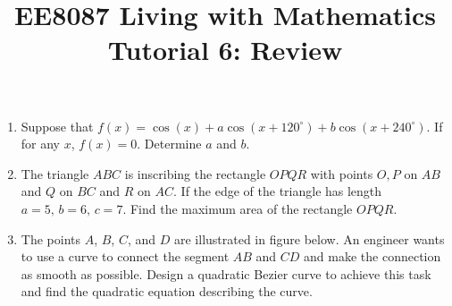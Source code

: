 \documentclass{article}
\title{EE8087 Living with Mathematics\\Tutorial 6: Review}
\date{}
\begin{document}
 \maketitle
\begin{enumerate}
\item Suppose that $f(x) = \cos(x)+a\cos(x+120^\circ)+b\cos(x+240^\circ)$. If for any $x$, $f(x) = 0$. Determine $a$ and $b$.
\item The triangle $ABC$ is inscribing the rectangle $OPQR$ with points $O,P$ on $AB$ and $Q$ on $BC$ and $R$ on $AC$. If the edge of the triangle has length $a = 5,\,b = 6,\, c = 7$. Find the maximum area of the rectangle $OPQR$.
  \begin{figure}[ht]
    \centering
  \end{figure}

\item The points $A$, $B$, $C$, and $D$ are illustrated in figure below. An engineer wants to use a curve to connect the segment $AB$ and $CD$ and make the connection as smooth as possible. Design a quadratic Bezier curve to achieve this task and find the quadratic equation describing the curve.

  \begin{figure}[ht]
    \centering
\end{figure}
\end{enumerate}
\end{document}
